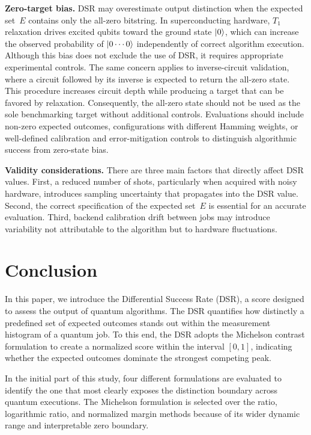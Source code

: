 \documentclass[10pt,conference]{IEEEtran}
\begin{document}
\textbf{Zero-target bias.} DSR may overestimate output distinction when the expected set~$E$ contains only the all-zero bitstring. In superconducting hardware, $T_1$ relaxation drives excited qubits toward the ground state $\ket{0}$, which can increase the observed probability of $\ket{0\cdots0}$ independently of correct algorithm execution. Although this bias does not exclude the use of DSR, it requires appropriate experimental controls. The same concern applies to inverse-circuit validation, where a circuit followed by its inverse is expected to return the all-zero state. This procedure increases circuit depth while producing a target that can be favored by relaxation. Consequently, the all-zero state should not be used as the sole benchmarking target without additional controls. Evaluations should include non-zero expected outcomes, configurations with different Hamming weights, or well-defined calibration and error-mitigation controls to distinguish algorithmic success from zero-state bias.

\textbf{Validity considerations.} There are three main factors that directly affect DSR values. First, a reduced number of shots, particularly when acquired with noisy hardware, introduces sampling uncertainty that propagates into the DSR value. Second, the correct specification of the expected set~$E$ is essential for an
accurate evaluation. Third, backend calibration drift between jobs may introduce variability not attributable to the algorithm but to hardware fluctuations.

\section{Conclusion}
\label{sec:conclusion}

In this paper, we introduce the Differential Success Rate (DSR), a score designed to assess the output of quantum algorithms. The DSR quantifies how distinctly a predefined set of expected outcomes stands out within the measurement histogram of a quantum job. To this end, the DSR adopts the Michelson contrast formulation to create a normalized score within the interval $[0, 1]$, indicating whether the expected outcomes dominate the strongest competing peak.

In the initial part of this study, four different formulations are evaluated to identify the one that most clearly exposes the distinction boundary across quantum executions. The Michelson formulation is selected over the ratio, logarithmic ratio, and normalized margin methods because of its wider dynamic range and interpretable zero boundary.
\end{document}
